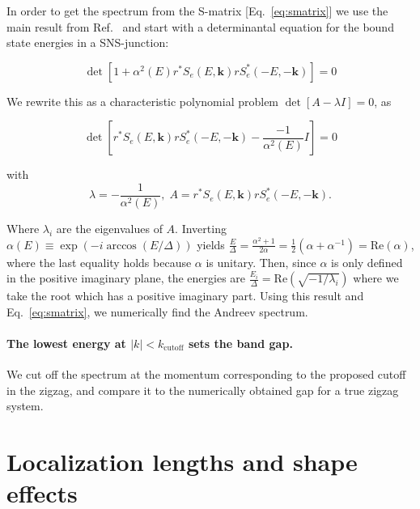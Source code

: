 \documentclass[english, twocolumn, 10pt, aps, superscriptaddress, floatfix, prb, citeautoscript]{revtex4-1}
\renewcommand{\comment}[2]{#2}
\renewcommand{\comment}{\paragraph}
\begin{document}
In order to get the spectrum from the S-matrix [Eq.~\eqref{eq:smatrix}] we use the main result from Ref.~ and start with a determinantal equation for the bound state energies in a SNS-junction:

\begin{equation}
\det\left[1+\alpha^{2}\left(E\right)r^{*}S_{e}\left(E,\bm{k}\right)rS_{e}^{*}\left(-E,-\bm{k}\right)\right]=0
\end{equation}

We rewrite this as a characteristic polynomial problem $\det\left[A-\lambda I\right]=0$, as

\begin{equation}
\det\left[r^{*}S_{e}\left(E,\bm{k}\right)rS_{e}^{*}\left(-E,-\bm{k}\right)-\frac{-1}{\alpha^{2}\left(E\right)}I\right]=0
\end{equation}

with
\begin{equation}
\lambda=-\frac{1}{\alpha^{2}\left(E\right)},\;A=r^{*}S_{e}\left(E,\bm{k}\right)rS_{e}^{*}\left(-E,-\bm{k}\right).
\end{equation}

Where $\lambda_i$ are the eigenvalues of $A$.
Inverting $\alpha\left(E\right)\equiv\exp\left(-i\arccos\left(E/\Delta\right)\right)$ yields $\frac{E}{\Delta}=\frac{\alpha^{2}+1}{2\alpha}=\frac{1}{2}\left(\alpha+\alpha^{-1}\right)=\textrm{Re}(\alpha)$, where the last equality holds because $\alpha$ is unitary.
Then, since $\alpha$ is only defined in the positive imaginary plane, the energies are $\frac{E_{i}}{\Delta}=\textrm{Re}\left(\sqrt{-1/\lambda_{i}}\right)$ where we take the root which has a positive imaginary part.
Using this result and Eq.~\eqref{eq:smatrix}, we numerically find the Andreev spectrum.

\comment{The lowest energy at $|k| < k_\textrm{cutoff}$ sets the band gap.}
We cut off the spectrum at the momentum corresponding to the proposed cutoff in the zigzag, and compare it to the numerically obtained gap for a true zigzag system.

\section{Localization lengths and shape effects}\label{sec:shape_effects}
\end{document}
